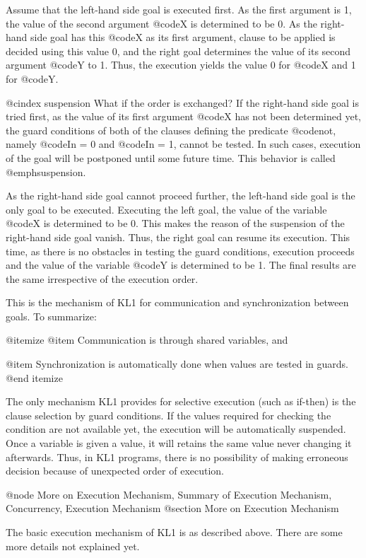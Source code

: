 Assume that the left-hand side goal is executed first.  As the first
argument is 1, the value of the second argument @code{X} is determined
to be 0.  As the right-hand side goal has this @code{X} as its first
argument, clause to be applied is decided using this value 0, and the
right goal determines the value of its second argument @code{Y} to 1.
Thus, the execution yields the value 0 for @code{X} and 1 for @code{Y}.

@cindex suspension
What if the order is exchanged?  If the right-hand side goal is tried
first, as the value of its first argument @code{X} has not been
determined yet, the guard conditions of both of the clauses defining the
predicate @code{not}, namely @code{In = 0} and @code{In = 1}, cannot be
tested.  In such cases, execution of the goal will be postponed until
some future time.  This behavior is called @emph{suspension}.

As the right-hand side goal cannot proceed further, the left-hand side
goal is the only goal to be executed.  Executing the left goal, the
value of the variable @code{X} is determined to be 0.  This makes the
reason of the suspension of the right-hand side goal vanish.  Thus, the
right goal can resume its execution.  This time, as there is no
obstacles in testing the guard conditions, execution proceeds and the
value of the variable @code{Y} is determined to be 1.  The final results
are the same irrespective of the execution order.

This is the mechanism of KL1 for communication and synchronization
between goals.  To summarize:

@itemize
@item
Communication is through shared variables, and

@item
Synchronization is automatically done when values are tested in guards.
@end itemize

The only mechanism KL1 provides for selective execution (such as
if-then) is the clause selection by guard conditions.  If the values
required for checking the condition are not available yet, the execution
will be automatically suspended.  Once a variable is given a value, it
will retains the same value never changing it afterwards.  Thus, in KL1
programs, there is no possibility of making erroneous decision because
of unexpected order of execution.

@node More on Execution Mechanism, Summary of Execution Mechanism, Concurrency, Execution Mechanism
@section More on Execution Mechanism

The basic execution mechanism of KL1 is as described above.  There are
some more details not explained yet.

